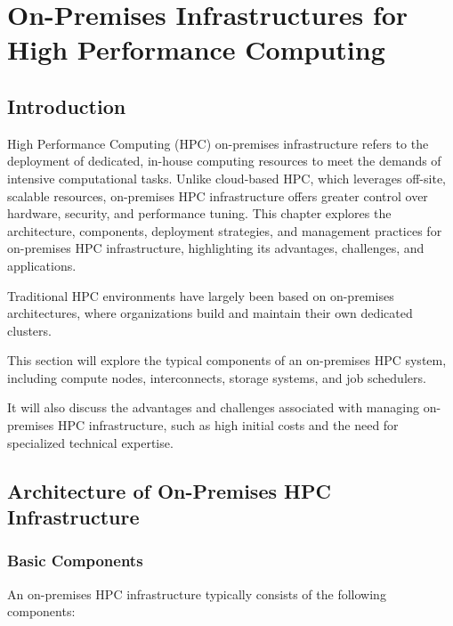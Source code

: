 

\chapter{On-Premises Infrastructures for High Performance Computing}

\section{Introduction}

High Performance Computing (HPC) on-premises infrastructure refers to the deployment of dedicated, in-house computing resources to meet the demands of intensive computational tasks. Unlike cloud-based HPC, which leverages off-site, scalable resources, on-premises HPC infrastructure offers greater control over hardware, security, and performance tuning. This chapter explores the architecture, components, deployment strategies, and management practices for on-premises HPC infrastructure, highlighting its advantages, challenges, and applications.

Traditional HPC environments have largely been based on on-premises architectures, where organizations build and maintain their own dedicated clusters. 

This section will explore the typical components of an on-premises HPC system, including compute nodes, interconnects, storage systems, and job schedulers. 

It will also discuss the advantages and challenges associated with managing on-premises HPC infrastructure, such as high initial costs and the need for specialized technical expertise.

\section{Architecture of On-Premises HPC Infrastructure}

\subsection{Basic Components}

An on-premises HPC infrastructure typically consists of the following components:

